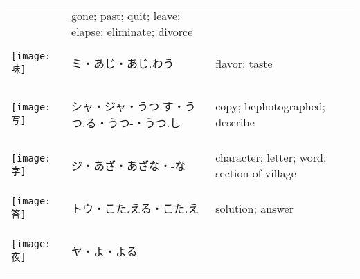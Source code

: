 \documentclass[a4paper,12pt]{extarticle}
\begin{document}
\begin{longtable}{|lp{6cm}p{4cm}|}
&
gone; past; quit; leave; elapse; eliminate; divorce
\\ 
\begin{minipage}{0.3\textwidth}
\centerline{
	\texttt{[image: 味]}
}
\end{minipage}
&
\begin{CJK}{UTF8}{min}ミ・あじ・あじ.わう\end{CJK}
&
flavor; taste
\\ 
\begin{minipage}{0.3\textwidth}
\centerline{
	\texttt{[image: 写]}
}
\end{minipage}
&
\begin{CJK}{UTF8}{min}シャ・ジャ・うつ.す・うつ.る・うつ-・うつ.し\end{CJK}
&
copy; bephotographed; describe
\\ 
\begin{minipage}{0.3\textwidth}
\centerline{
	\texttt{[image: 字]}
}
\end{minipage}
&
\begin{CJK}{UTF8}{min}ジ・あざ・あざな・-な\end{CJK}
&
character; letter; word; section of village
\\ 
\begin{minipage}{0.3\textwidth}
\centerline{
	\texttt{[image: 答]}
}
\end{minipage}
&
\begin{CJK}{UTF8}{min}トウ・こた.える・こた.え\end{CJK}
&
solution; answer
\\ 
\begin{minipage}{0.3\textwidth}
\centerline{
	\texttt{[image: 夜]}
}
\end{minipage}
&
\begin{CJK}{UTF8}{min}ヤ・よ・よる\end{CJK}

\end{longtable}
\end{document}
